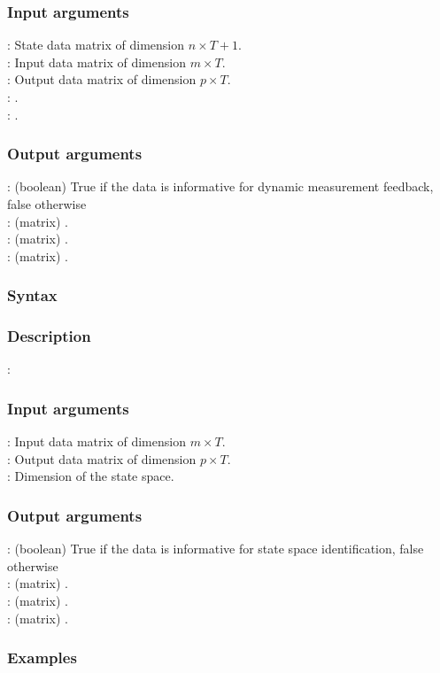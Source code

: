 \subsubsection*{Input arguments} 
\textbf{}: State data matrix of dimension $n \times T+1$.\\
\textbf{}: Input data matrix of dimension $m \times T$.\\
\textbf{}: Output data matrix of dimension $p \times T$.\\
\textbf{}: .\\
\textbf{}: .

\subsubsection*{Output arguments} 
\textbf{}: (boolean) True if the data is informative for dynamic measurement feedback, false otherwise\\
\textbf{}: (matrix) .\\
\textbf{}: (matrix) .\\
\textbf{}: (matrix) .


\subsubsection*{Syntax}

\subsubsection*{Description}
: 

\subsubsection*{Input arguments}
\textbf{}: Input data matrix of dimension $m \times T$.\\
\textbf{}: Output data matrix of dimension $p \times T$.\\
\textbf{}: Dimension of the state space.

\subsubsection*{Output arguments}
\textbf{}: (boolean) True if the data is informative for state space identification, false otherwise\\
\textbf{}: (matrix) .\\
\textbf{}: (matrix) .\\
\textbf{}: (matrix) .

\subsubsection{Examples}